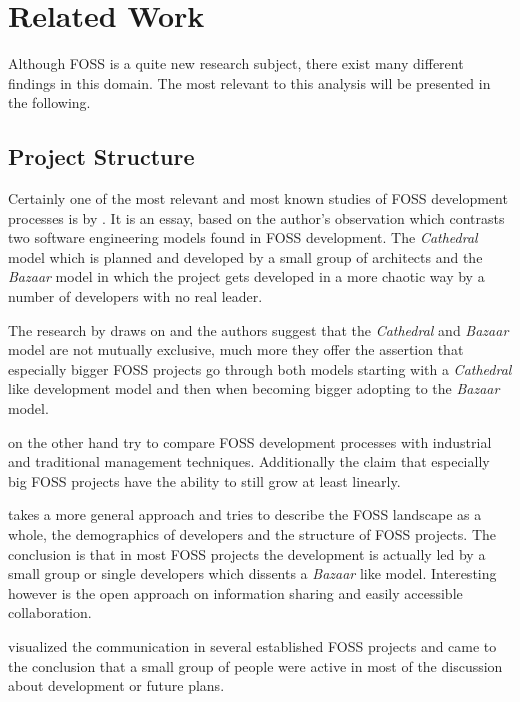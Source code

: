 \chapter{Related Work} %
\label{chap:related work}

Although \ac{FOSS} is a quite new research subject, there exist many different
findings in this domain. The most relevant to this analysis will be presented
in the following.

\section{Project Structure} %

Certainly one of the most relevant and most known studies of \ac{FOSS}
development processes is  by \textcite{Raymond1998}. It
is an essay, based on the author's observation which contrasts two software
engineering models found in \ac{FOSS} development. The \emph{Cathedral} model
which is planned and developed by a small group of architects and the
\emph{Bazaar} model in which the project gets developed in a more chaotic way
by a number of developers with no real leader.

The research by \textcite{Capiluppi2007} draws on  and
the authors suggest that the \emph{Cathedral} and \emph{Bazaar} model are not
mutually exclusive, much more they offer the assertion that especially bigger
\ac{FOSS} projects go through both models starting with a \emph{Cathedral} like
development model and then when becoming bigger adopting to the \emph{Bazaar}
model.

\textcite{Godfrey2000} on the other hand try to compare \ac{FOSS} development
processes with industrial and traditional management techniques. Additionally
the claim that especially big \ac{FOSS} projects have the ability to still grow
at least linearly.

\textcite{Kim2003} takes a more general approach and tries to describe the
\ac{FOSS} landscape as a whole, the demographics of developers and the
structure of \ac{FOSS} projects. The conclusion is that in most \ac{FOSS}
projects the development is actually led by a small group or single developers
which dissents a \emph{Bazaar} like model. Interesting however is the open
approach on information sharing and easily accessible collaboration.

\textcite{Ogawa2007} visualized the communication in several established
\ac{FOSS} projects and came to the conclusion that a small group of people were
active in most of the discussion about development or future plans.

